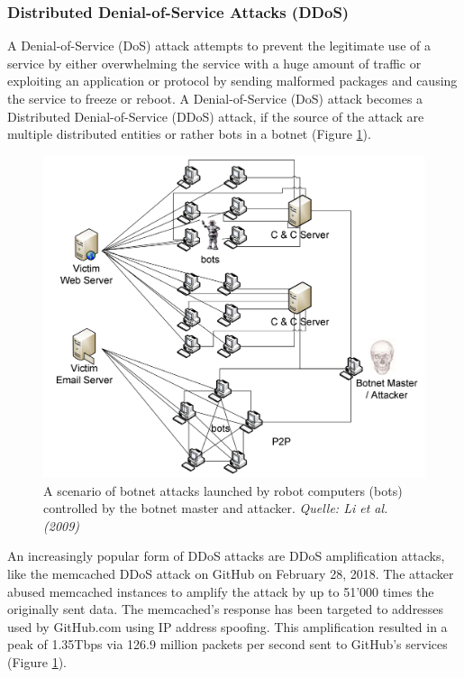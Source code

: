		\subsubsection{Distributed Denial-of-Service Attacks (DDoS)}
A Denial-of-Service (DoS) attack attempts to prevent the legitimate use of a service by either overwhelming the service with a huge amount of traffic or exploiting an application or protocol by sending malformed packages and causing the service to freeze or reboot. A Denial-of-Service (DoS) attack becomes a Distributed Denial-of-Service (DDoS) attack, if the source of the attack are multiple distributed entities or rather bots in a botnet (Figure \ref{fig:ddos}). \cite{Mirkovic04}

\begin{figure}[ht]
\begin{center} \includegraphics[scale=0.4]{Talk11/DDoS-attack} \end{center}
\caption{A scenario of botnet attacks launched by robot computers (bots) controlled by the botnet master and attacker. \textit{Quelle: Li et al. (2009)}}
\label{fig:ddos}
\end{figure}

An increasingly popular form of DDoS attacks are DDoS amplification attacks, like the memcached DDoS attack on GitHub on February 28, 2018. The attacker abused memcached instances to amplify the attack by up to 51'000 times the originally sent data. The memcached's response has been targeted to addresses used by GitHub.com using IP address spoofing. This amplification resulted in a peak of 1.35Tbps via 126.9 million packets per second sent to GitHub's services (Figure \ref{fig:ddos}). \cite{Kottler18}

